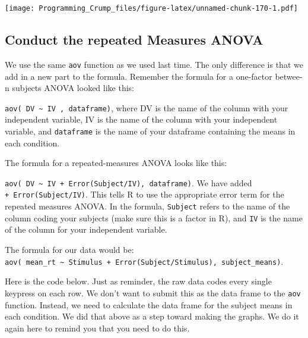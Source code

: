 \documentclass[]{book}
\theoremstyle{definition}
\theoremstyle{definition}
\theoremstyle{definition}
\theoremstyle{remark}
\begin{document}
\texttt{[image: Programming\_Crump\_files/figure-latex/unnamed-chunk-170-1.pdf]}

\subsection{Conduct the repeated Measures
ANOVA}\label{conduct-the-repeated-measures-anova}

We use the same \texttt{aov} function as we used last time. The only
difference is that we add in a new part to the formula. Remember the
formula for a one-factor betwee-n subjects ANOVA looked like this:

\texttt{aov(\ DV\ \textasciitilde{}\ IV\ ,\ dataframe)}, where DV is the
name of the column with your independent variable, IV is the name of the
column with your independent variable, and \texttt{dataframe} is the
name of your dataframe containing the means in each condition.

The formula for a repeated-measures ANOVA looks like this:

\texttt{aov(\ DV\ \textasciitilde{}\ IV\ +\ Error(Subject/IV),\ dataframe)}.
We have added \texttt{+\ Error(Subject/IV)}. This tells R to use the
appropriate error term for the repeated measures ANOVA. In the formula,
\texttt{Subject} refers to the name of the column coding your subjects
(make sure this is a factor in R), and \texttt{IV} is the name of the
column for your independent variable.

The formula for our data would be:
\texttt{aov(\ mean\_rt\ \textasciitilde{}\ Stimulus\ +\ Error(Subject/Stimulus),\ subject\_means)}.

Here is the code below. Just as reminder, the raw data codes every
single keypress on each row. We don't want to submit this as the data
frame to the \texttt{aov} function. Instead, we need to calculate the
data frame for the subject means in each condition. We did that above as
a step toward making the graphs. We do it again here to remind you that
you need to do this.
\end{document}
